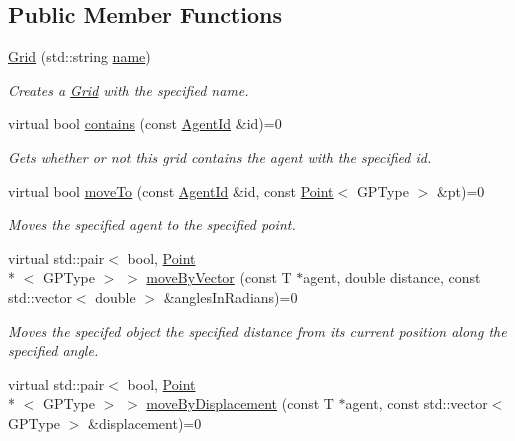 \subsection*{Public Member Functions}
\begin{DoxyCompactItemize}
\item 
\hyperlink{classrepast_1_1_grid_a0ee11fc5977ad4951f199cb90338c45f}{Grid} (std\-::string \hyperlink{classrepast_1_1_projection_ab60a0ab4f584685780307d7431b61800}{name})
\begin{DoxyCompactList}\small\item\em Creates a \hyperlink{classrepast_1_1_grid}{Grid} with the specified name. \end{DoxyCompactList}\item 
virtual bool \hyperlink{classrepast_1_1_grid_a022599f875eeb1e72c11766500d8282c}{contains} (const \hyperlink{classrepast_1_1_agent_id}{Agent\-Id} \&id)=0
\begin{DoxyCompactList}\small\item\em Gets whether or not this grid contains the agent with the specified id. \end{DoxyCompactList}\item 
virtual bool \hyperlink{classrepast_1_1_grid_ae5bf061d62f1998e0c75bf3967ac63d3}{move\-To} (const \hyperlink{classrepast_1_1_agent_id}{Agent\-Id} \&id, const \hyperlink{classrepast_1_1_point}{Point}$<$ G\-P\-Type $>$ \&pt)=0
\begin{DoxyCompactList}\small\item\em Moves the specified agent to the specified point. \end{DoxyCompactList}\item 
virtual std\-::pair$<$ bool, \hyperlink{classrepast_1_1_point}{Point}\\*
$<$ G\-P\-Type $>$ $>$ \hyperlink{classrepast_1_1_grid_adea1658b984c21ae95bd8f25ecb609b6}{move\-By\-Vector} (const T $\ast$agent, double distance, const std\-::vector$<$ double $>$ \&angles\-In\-Radians)=0
\begin{DoxyCompactList}\small\item\em Moves the specifed object the specified distance from its current position along the specified angle. \end{DoxyCompactList}\item 
virtual std\-::pair$<$ bool, \hyperlink{classrepast_1_1_point}{Point}\\*
$<$ G\-P\-Type $>$ $>$ \hyperlink{classrepast_1_1_grid_a20efd6bdadf8dac405542de7e33f6b9e}{move\-By\-Displacement} (const T $\ast$agent, const std\-::vector$<$ G\-P\-Type $>$ \&displacement)=0

\end{DoxyCompactItemize}
